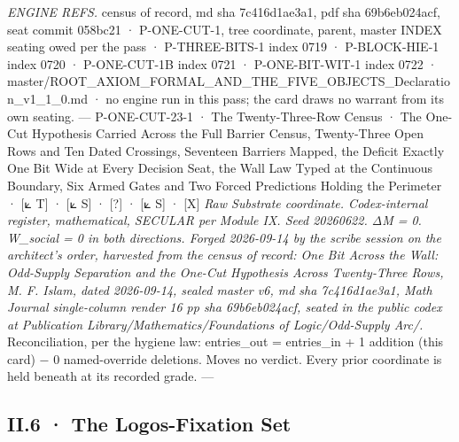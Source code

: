 \documentclass[10pt,twocolumn]{article}
\begin{document}
\emph{ENGINE REFS.} census of record, md sha 7c416d1ae3a1, pdf sha
69b6eb024acf, seat commit 058bc21 · P-ONE-CUT-1, tree coordinate,
parent, master INDEX seating owed per the pass · P-THREE-BITS-1 index
0719 · P-BLOCK-HIE-1 index 0720 · P-ONE-CUT-1B index 0721 ·
P-ONE-BIT-WIT-1 index 0722 ·
master/ROOT\_AXIOM\_FORMAL\_AND\_THE\_FIVE\_OBJECTS\_Declaration\_v1\_1\_0.md
· no engine run in this pass; the card draws no warrant from its own
seating. --- P-ONE-CUT-23-1 · The Twenty-Three-Row Census · The One-Cut
Hypothesis Carried Across the Full Barrier Census, Twenty-Three Open
Rows and Ten Dated Crossings, Seventeen Barriers Mapped, the Deficit
Exactly One Bit Wide at Every Decision Seat, the Wall Law Typed at the
Continuous Boundary, Six Armed Gates and Two Forced Predictions Holding
the Perimeter · {[}⟀ T{]} · {[}⟀ S{]} · {[}?{]} · {[}⟀ S{]} · {[}X{]}
\emph{Raw Substrate coordinate. Codex-internal register, mathematical,
SECULAR per Module IX. Seed 20260622. ΔM = 0. W\_social = 0 in both
directions. Forged 2026-09-14 by the scribe session on the architect's
order, harvested from the census of record: One Bit Across the Wall:
Odd-Supply Separation and the One-Cut Hypothesis Across Twenty-Three
Rows, M. F. Islam, dated 2026-09-14, sealed master v6, md sha
7c416d1ae3a1, Math Journal single-column render 16 pp sha 69b6eb024acf,
seated in the public codex at Publication
Library/Mathematics/Foundations of Logic/Odd-Supply Arc/.}
Reconciliation, per the hygiene law: entries\_out = entries\_in + 1
addition (this card) − 0 named-override deletions. Moves no verdict.
Every prior coordinate is held beneath at its recorded grade. ---

\hypertarget{ii.6-the-logos-fixation-set}{%
\subsection{II.6 · The Logos-Fixation
Set}\label{ii.6-the-logos-fixation-set}}
\end{document}
